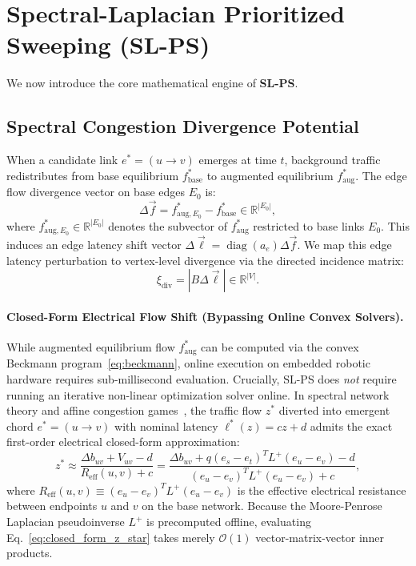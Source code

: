 \documentclass[11pt,a4paper]{article}
\begin{document}
\section{Spectral-Laplacian Prioritized Sweeping (SL-PS)}
\label{sec:method}

We now introduce the core mathematical engine of \textbf{SL-PS}.

\subsection{Spectral Congestion Divergence Potential}
When a candidate link $e^* = (u \to v)$ emerges at time $t$, background traffic redistributes from base equilibrium $f_{\text{base}}^*$ to augmented equilibrium $f_{\text{aug}}^*$. The edge flow divergence vector on base edges $E_0$ is:
\begin{equation}
\Delta \vec{f} = f_{\text{aug}, E_0}^* - f_{\text{base}}^* \in \mathbb{R}^{|E_0|},
\end{equation}
where $f_{\text{aug}, E_0}^* \in \mathbb{R}^{|E_0|}$ denotes the subvector of $f_{\text{aug}}^*$ restricted to base links $E_0$. This induces an edge latency shift vector $\Delta \vec{\ell} = \operatorname{diag}(a_e) \Delta \vec{f}$. We map this edge latency perturbation to vertex-level divergence via the directed incidence matrix:
\begin{equation}
\xi_{\text{div}} = |B \Delta \vec{\ell}| \in \mathbb{R}^{|V|}.
\end{equation}

\paragraph{Closed-Form Electrical Flow Shift (Bypassing Online Convex Solvers).}
While augmented equilibrium flow $f_{\text{aug}}^*$ can be computed via the convex Beckmann program~\eqref{eq:beckmann}, online execution on embedded robotic hardware requires sub-millisecond evaluation. Crucially, SL-PS does \textit{not} require running an iterative non-linear optimization solver online. In spectral network theory and affine congestion games~\cite{spielman2025sagt,lu2026braess}, the traffic flow $z^*$ diverted into emergent chord $e^* = (u \to v)$ with nominal latency $\ell^*(z) = c z + d$ admits the exact first-order electrical closed-form approximation:
\begin{equation}
\label{eq:closed_form_z_star}
z^* \approx \frac{\Delta b_{uv} + V_{uv} - d}{R_{\text{eff}}(u, v) + c} = \frac{\Delta b_{uv} + q (e_s - e_t)^T L^+ (e_u - e_v) - d}{(e_u - e_v)^T L^+ (e_u - e_v) + c},
\end{equation}
where $R_{\text{eff}}(u, v) \equiv (e_u - e_v)^T L^+ (e_u - e_v)$ is the effective electrical resistance between endpoints $u$ and $v$ on the base network. Because the Moore-Penrose Laplacian pseudoinverse $L^+$ is precomputed offline, evaluating Eq.~\eqref{eq:closed_form_z_star} takes merely $\mathcal{O}(1)$ vector-matrix-vector inner products. 
\end{document}
